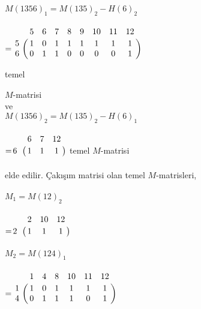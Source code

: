 \documentclass{article}
\begin{document}
\hspace{3mm}
$M(1356)_{1} = M(135)_{2} - H(6)_{2}$\\
\\

\hspace{19mm}
$ = \bordermatrix{~ & 5 & 6 & 7 & 8 & 9 & 10 & 11 & 12 \cr
                    5 & 1 & 0 & 1 & 1 & 1 & 1 & 1 & 1 \cr
                    6 & 0 & 1 & 1 & 0 & 0 & 0 & 0 & 1}$
                    
\hspace{60mm}  temel 

\hspace{60mm} $M$-matrisi \\

ve \\
 
\hspace{3mm}
$M(1356)_{2} = M(135)_{2} - H(6)_{1}$ \\
\\

\hspace{19mm}
$ = \bordermatrix{~ & 6 & 7 & 12 \cr
                    6 & 1 & 1 & 1}$    temel $M$-matrisi\\
                    \\
 elde edilir. Çakışım matrisi olan temel $M$-matrisleri, \\
\\

\hspace{3mm}
$M_{1} = M(12)_{2}$ \\
\\

\hspace{19mm}
$ = \bordermatrix{~ & 2 & 10 & 12 \cr
                    2 & 1 & 1 & 1}$\\
\\

\hspace{3mm}
$M_{2} = M(124)_{1}$\\
\\

\hspace{19mm}
$ = \bordermatrix{~ & 1 & 4 & 8 & 10 & 11 & 12 \cr
                    1 & 1 & 0 & 1 & 1 & 1 & 1 \cr
                    4 & 0 & 1 & 1 & 1 & 0 & 1}$
\end{document}
